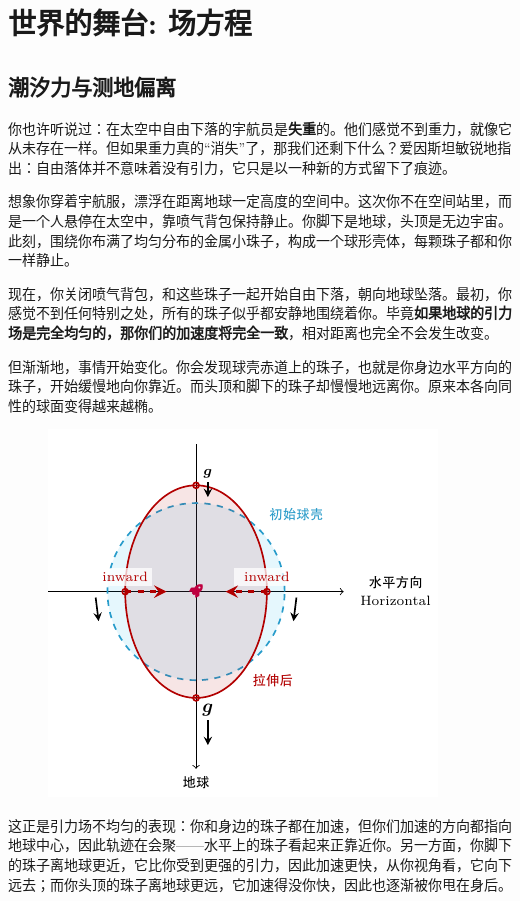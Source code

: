 \documentclass{article}
\begin{document}
\section{世界的舞台: 场方程}
\subsection{潮汐力与测地偏离}

你也许听说过：在太空中自由下落的宇航员是\textbf{失重}的。他们感觉不到重力，就像它从未存在一样。但如果重力真的“消失”了，那我们还剩下什么？爱因斯坦敏锐地指出：自由落体并不意味着没有引力，它只是以一种新的方式留下了痕迹。

想象你穿着宇航服，漂浮在距离地球一定高度的空间中。这次你不在空间站里，而是一个人悬停在太空中，靠喷气背包保持静止。你脚下是地球，头顶是无边宇宙。此刻，围绕你布满了均匀分布的金属小珠子，构成一个球形壳体，每颗珠子都和你一样静止。

现在，你关闭喷气背包，和这些珠子一起开始自由下落，朝向地球坠落。最初，你感觉不到任何特别之处，所有的珠子似乎都安静地围绕着你。毕竟\textbf{如果地球的引力场是完全均匀的，那你们的加速度将完全一致}，相对距离也完全不会发生改变。

但渐渐地，事情开始变化。你会发现球壳赤道上的珠子，也就是你身边水平方向的珠子，开始缓慢地向你靠近。而头顶和脚下的珠子却慢慢地远离你。原来本各向同性的球面变得越来越椭。
\begin{figure}[h]
    \centering
    \includegraphics[scale=1.2]{./tikz/fig1.pdf}
\end{figure}

这正是引力场不均匀的表现：你和身边的珠子都在加速，但你们加速的方向都指向地球中心，因此轨迹在会聚——水平上的珠子看起来正靠近你。另一方面，你脚下的珠子离地球更近，它比你受到更强的引力，因此加速更快，从你视角看，它向下远去；而你头顶的珠子离地球更远，它加速得没你快，因此也逐渐被你甩在身后。
\end{document}
